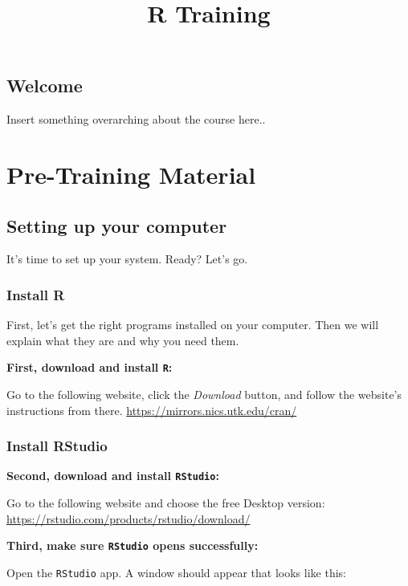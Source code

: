 \documentclass[
]{book}
\title{R Training}
\author{}
\date{\vspace{-2.5em}}
\begin{document}
\maketitle

{
\setcounter{tocdepth}{1}
\tableofcontents
}
\chapter{Welcome}\label{welcome}

Insert something overarching about the course here..

\part{Pre-Training Material}\label{part-pre-training-material}

\chapter{Setting up your computer}\label{setting-up-your-computer}

It's time to set up your system. Ready? Let's go.

\section*{Install R}\label{install-r}

First, let's get the right programs installed on your computer. Then we will explain what they are and why you need them.

\textbf{First, download and install \texttt{R}: }

Go to the following website, click the \emph{Download} button, and follow the website's instructions from there.
\url{https://mirrors.nics.utk.edu/cran/}

\section*{Install RStudio}\label{install-rstudio}

\textbf{Second, download and install \texttt{RStudio}:}

Go to the following website and choose the free Desktop version:
\url{https://rstudio.com/products/rstudio/download/}

\textbf{Third, make sure \texttt{RStudio} opens successfully:}

Open the \texttt{RStudio} app. A window should appear that looks like this:
\end{document}
